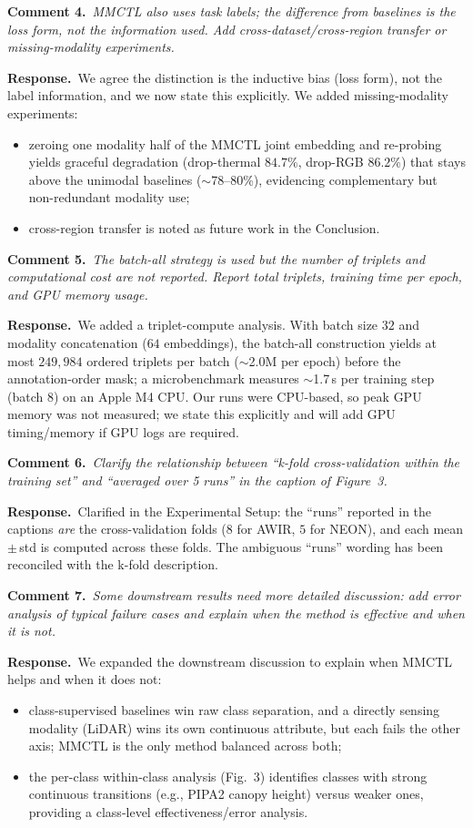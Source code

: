 \documentclass[10pt,twocolumn,letterpaper]{article}
\newcommand{\cmt}[2]{\smallskip\noindent\textbf{Comment #1.}\ \textit{#2}\par}
\newcommand{\resp}[1]{\noindent\textbf{Response.}\ #1\par}
\begin{document}
\cmt{4}{MMCTL also uses task labels; the difference from baselines is the loss
form, not the information used. Add cross-dataset/cross-region transfer or
missing-modality experiments.}
\resp{We agree the distinction is the inductive bias (loss form), not the label
information, and we now state this explicitly. We added missing-modality
experiments:}
\begin{itemize}
  \item zeroing one modality half of the MMCTL joint embedding and re-probing yields graceful degradation (drop-thermal $84.7\%$, drop-RGB $86.2\%$) that stays above the unimodal baselines ($\sim$78--80\%), evidencing complementary but non-redundant modality use;
  \item cross-region transfer is noted as future work in the Conclusion.
\end{itemize}

\cmt{5}{The batch-all strategy is used but the number of triplets and
computational cost are not reported. Report total triplets, training time per
epoch, and GPU memory usage.}
\resp{We added a triplet-compute analysis. With batch size $32$ and modality
concatenation ($64$ embeddings), the batch-all construction yields at most
$249{,}984$ ordered triplets per batch ($\sim$2.0M per epoch) before the
annotation-order mask; a microbenchmark measures $\sim$1.7\,s per training step
(batch $8$) on an Apple M4 CPU. Our runs were CPU-based, so peak GPU memory was
not measured; we state this explicitly and will add GPU timing/memory if GPU logs
are required.}

\cmt{6}{Clarify the relationship between ``k-fold cross-validation within the
training set'' and ``averaged over 5 runs'' in the caption of Figure~3.}
\resp{Clarified in the Experimental Setup: the ``runs'' reported in the captions
\emph{are} the cross-validation folds ($8$ for AWIR, $5$ for NEON), and each
mean\,$\pm$\,std is computed across these folds. The ambiguous ``runs'' wording
has been reconciled with the k-fold description.}

\cmt{7}{Some downstream results need more detailed discussion: add error analysis
of typical failure cases and explain when the method is effective and when it is
not.}
\resp{We expanded the downstream discussion to explain when MMCTL helps and when
it does not:}
\begin{itemize}
  \item class-supervised baselines win raw class separation, and a directly sensing modality (LiDAR) wins its own continuous attribute, but each fails the other axis; MMCTL is the only method balanced across both;
  \item the per-class within-class analysis (Fig.~3) identifies classes with strong continuous transitions (e.g., PIPA2 canopy height) versus weaker ones, providing a class-level effectiveness/error analysis.
\end{itemize}
\end{document}
